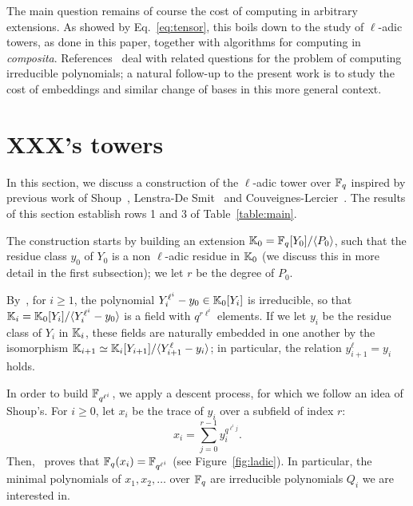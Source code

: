 \documentclass{sig-alternate}
\begin{document}
The main question remains of course the cost of computing in arbitrary
extensions. As showed by Eq.~\eqref{eq:tensor}, this boils down to the
study of $\ell$-adic towers, as done in this paper, together with
algorithms for computing in \emph{composita}.
References~\cite{Shoup90,shoup94,couveignes+lercier11} deal with
related questions for the problem of computing irreducible polynomials;
a natural follow-up to the present work is to study the cost of
embeddings and similar change of bases in this more general context.


\section{XXX's towers}
\label{sec:LDtower}

In this section, we discuss a construction of the $\ell$-adic tower
over $\mathbb{F}_q$ inspired by previous work of Shoup~\cite{Shoup90,shoup94},
Lenstra-De Smit~\cite{lenstra+desmit08-stdmodels} and
Couveignes-Lercier~\cite{couveignes+lercier11}. The results of this
section establish rows 1 and 3 of Table~\ref{table:main}.

The construction starts by building an extension $\mathbb{K}_0 =
\mathbb{F}_q[Y_0]/\langle P_0 \rangle$, such that the residue class $y_0$ of
$Y_0$ is a non $\ell$-adic residue in $\mathbb{K}_0$ (we discuss this in more
detail in the first subsection); we let $r$ be the degree of
$P_0$.

By~\cite[Th.~VI.9.1]{lang}, for $i\ge 1$, the polynomial
$Y_i^{\ell^i}-y_0 \in \mathbb{K}_0[Y_i]$ is irreducible, so that $\mathbb{K}_i=
\mathbb{K}_0[Y_i]/\langle Y_i^{\ell^i}-y_0\rangle$ is a field with $q^{r
  \ell^i}$ elements.  If we let $y_i$ be the residue class of $Y_i$ in
$\mathbb{K}_i$, these fields are naturally embedded in one another by the
isomorphism $\mathbb{K}_{i+1} \simeq \mathbb{K}_i[Y_{i+1}]/\langle
Y_{i+1}^\ell-y_i\rangle$; in particular, the relation
$y_{i+1}^\ell=y_i$ holds.

In order to build $\mathbb{F}_{q^{\ell^i}}$, we apply a descent process, for
which we follow an idea of Shoup's. For $i \ge 0$, let $x_i$ be the
trace of $y_i$ over a subfield of index $r$:
\begin{equation}\label{eq-def:xi}
x_i = \sum_{j = 0}^{r-1} y_i^{q^{\ell^i j}}.  
\end{equation}
Then,~\cite[Th.~2.1]{Shoup90} proves that $\mathbb{F}_q(x_i)=\mathbb{F}_{q^{\ell^i}}$
(see Figure~\ref{fig:ladic}). In particular,
the minimal polynomials of $x_1,x_2,\dots$ over $\mathbb{F}_q$ are
irreducible polynomials $Q_i$ we are interested in.
\end{document}
